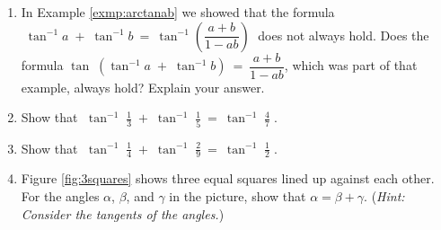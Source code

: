 {\begin{enumerate}[\bfseries 1.]
\begin{multicols}{4}
\end{multicols}
 For Exercises 26-33, prove the given identity.
[{[\bfseries 1.]}]
 \item In Example \ref{exmp:arctanab} we showed that the formula
  $\;\tan^{-1} a \;+\; \tan^{-1} b ~=~ \tan^{-1} \left( \dfrac{a+b}{1-ab} \right)\;$ does not
  always hold. Does the formula
  $\tan\;(\tan^{-1} a \;+\; \tan^{-1} b ) ~=~ \dfrac{a+b}{1-ab}$, which was part of that example,
  always hold? Explain your answer.
 \item Show that $\;\tan^{-1}\;\frac{1}{3}\;+\;\tan^{-1}\;\frac{1}{5} ~=~ \tan^{-1}\;\frac{4}{7}\;$.
 \item Show that $\;\tan^{-1}\;\frac{1}{4}\;+\;\tan^{-1}\;\frac{2}{9} ~=~ \tan^{-1}\;\frac{1}{2}\;$.
 \item\label{exer:3squares}
  Figure \ref{fig:3squares} shows three equal squares lined up against each other. For the
  angles $\alpha$, $\beta$, and $\gamma$ in the picture, show that $\alpha = \beta + \gamma$.
  (\emph{Hint: Consider the tangents of the angles.})


\end{enumerate}}

